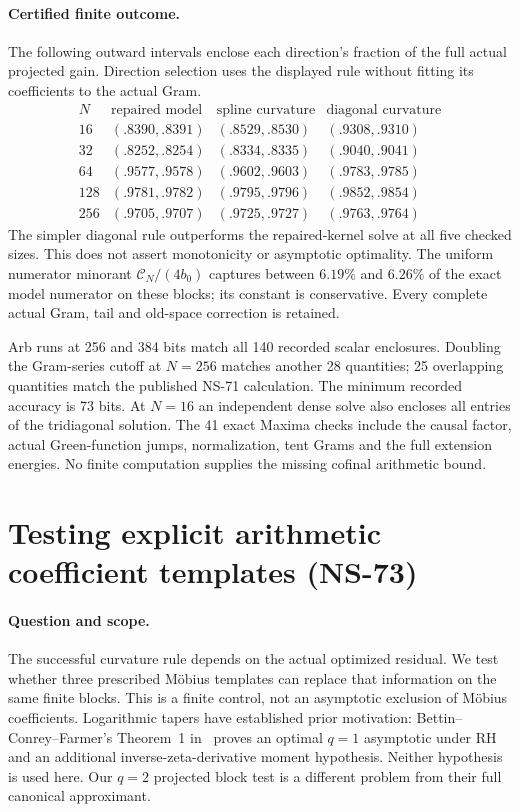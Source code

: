\paragraph{Certified finite outcome.}
The following outward intervals enclose each direction's fraction of the
full actual projected gain. Direction selection uses the displayed rule
without fitting its coefficients to the actual Gram.
\[
\begin{array}{c|ccc}
 N&\text{repaired model}&\text{spline curvature}&\text{diagonal curvature}\\ \hline
16&(.8390,.8391)&(.8529,.8530)&(.9308,.9310)\\
32&(.8252,.8254)&(.8334,.8335)&(.9040,.9041)\\
64&(.9577,.9578)&(.9602,.9603)&(.9783,.9785)\\
128&(.9781,.9782)&(.9795,.9796)&(.9852,.9854)\\
256&(.9705,.9707)&(.9725,.9727)&(.9763,.9764)
\end{array}
\]
The simpler diagonal rule outperforms the repaired-kernel solve at all
five checked sizes. This does not assert monotonicity or asymptotic
optimality. The uniform numerator minorant $\mathcal C_N/(4b_0)$ captures
between $6.19\%$ and $6.26\%$ of the exact model numerator on these blocks;
its constant is conservative. Every complete actual Gram, tail and
old-space correction is retained.

Arb runs at 256 and 384 bits match all 140 recorded scalar enclosures.
Doubling the Gram-series cutoff at $N=256$ matches another 28 quantities;
25 overlapping quantities match the published NS-71 calculation.
The minimum recorded accuracy is 73 bits. At $N=16$ an independent
dense solve also encloses all entries of the tridiagonal solution.
The 41 exact Maxima checks include the causal factor, actual Green-function
jumps, normalization, tent Grams and the full extension energies.
No finite computation supplies the missing cofinal arithmetic bound.

\section{Testing explicit arithmetic coefficient templates (NS-73)}
\label{sec:ns73-mobius-templates}

\paragraph{Question and scope.}
The successful curvature rule depends on the actual optimized residual.
We test whether three prescribed M\"obius templates can replace that
information on the same finite blocks. This is a finite control, not an
asymptotic exclusion of M\"obius coefficients. Logarithmic tapers have
established prior motivation: Bettin--Conrey--Farmer's Theorem~1
in~\cite{BettinConreyFarmer2013} proves an optimal $q=1$ asymptotic under
RH and an additional inverse-zeta-derivative moment hypothesis. Neither
hypothesis is used here. Our $q=2$ projected block test is a different
problem from their full canonical approximant.

